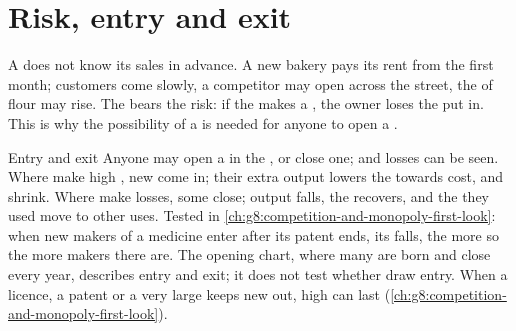 \section{Risk, entry and exit}

A  does not know its sales in advance. A new bakery pays its rent from the first month;
customers come slowly, a competitor may open across the street, the  of flour may rise.
The  bears the risk: if the  makes a , the owner loses the  put in.
This is why the possibility of a  is needed for anyone to open a .

\begin{model}{Entry and exit}
\assumes Anyone may open a  in the , or close one;  and losses can be seen.
\predicts Where  make high , new  come in; their extra output lowers the 
towards cost, and  shrink. Where  make losses, some close; output falls, the 
recovers, and the  they used move to other uses.
\tested Tested in \cref{ch:g8:competition-and-monopoly-first-look}: when new makers of a medicine
enter after its patent ends, its  falls, the more so the more makers there are. The opening
chart, where many  are born and close every year, describes entry and exit; it does not test
whether  draw entry.
\breaks When a licence, a patent or a very large  keeps new  out, high  can
last (\cref{ch:g8:competition-and-monopoly-first-look}).
\end{model}


